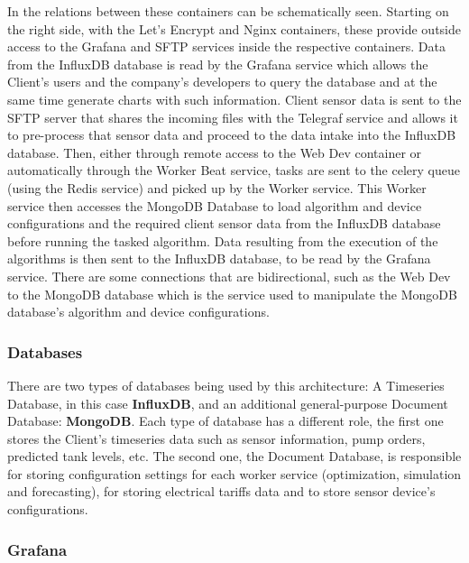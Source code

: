 In  the relations between these containers can be schematically seen. Starting on the right side, with the  Let's Encrypt and Nginx containers, these provide outside access to the Grafana and SFTP services inside the respective containers. Data from the InfluxDB database is read by the Grafana service which allows the Client's users and the company's developers to query the database and at the same time generate charts with such information. Client sensor data is sent to the SFTP server that shares the incoming files with the Telegraf service and allows it to pre-process that sensor data and proceed to the data intake into the InfluxDB database. Then, either through remote access to the Web Dev container or automatically through the Worker Beat service, tasks are sent to the celery queue (using the Redis service) and picked up by the Worker service. This Worker service then accesses the MongoDB Database to load algorithm and device configurations and the required client sensor data from the InfluxDB database before running the tasked algorithm. Data resulting from the execution of the algorithms is then sent to the InfluxDB database, to be read by the Grafana service. There are some connections that are bidirectional, such as the Web Dev to the MongoDB database which is the service used to manipulate the MongoDB database's algorithm and device configurations.


\subsubsection{Databases}\label{methodology:sss:databases}

There are two types of databases being used by this architecture: A Timeseries Database, in this case \textbf{InfluxDB}, and an additional general-purpose Document Database: \textbf{MongoDB}. Each type of database has a different role, the first one stores the Client's timeseries data such as sensor information, pump orders, predicted tank levels, etc.
The second one, the Document Database, is responsible for storing configuration settings for each worker service (optimization, simulation and forecasting), for storing electrical tariffs data and to store sensor device's configurations.

\subsubsection{Grafana}\label{methodology:sss:grafana}

